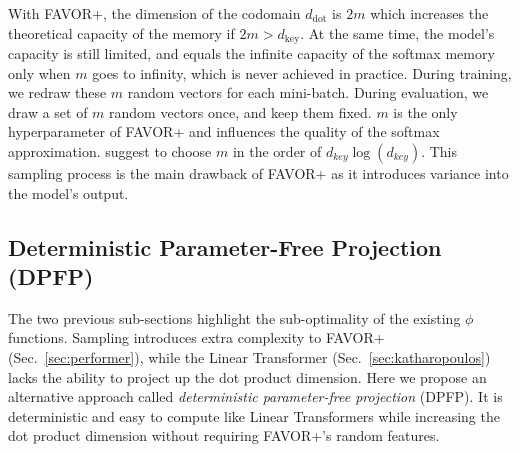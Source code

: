 \documentclass{article}
\theoremstyle{definition}
\begin{document}
With FAVOR+, the dimension of the codomain $d_\text{dot}$ is $2m$ which increases the theoretical capacity of the memory if $2m > d_\text{key}$. 
At the same time, the model's capacity is still limited, and equals the infinite capacity of the softmax memory only when $m$ goes to infinity, which is never achieved in practice.
During training, we redraw these $m$ random vectors for each mini-batch.
During evaluation, we draw a set of $m$ random vectors once, and keep them fixed.
$m$ is the only hyperparameter of FAVOR+ and influences the quality of the softmax approximation. 
\citet{choromanski2020rethinking} suggest to choose $m$ in the order of $d_\textit{key}\log(d_\textit{key})$.
This sampling process is the main drawback of FAVOR+ as it introduces variance into the model's output.

\subsection{Deterministic Parameter-Free Projection (DPFP)}
\label{sec:phi}
The two previous sub-sections highlight the sub-optimality of the existing $\phi$ functions.
Sampling introduces extra complexity to FAVOR+ (Sec.~\ref{sec:performer}),
while the Linear Transformer (Sec.~\ref{sec:katharopoulos}) lacks the ability to project up the dot product dimension.
Here we propose an alternative approach called \textit{deterministic parameter-free projection} (DPFP).
It is deterministic and easy to compute like Linear Transformers
while increasing the dot product dimension
without requiring FAVOR+'s random features.
\end{document}
